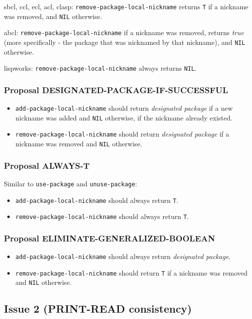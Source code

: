 \documentclass[11pt]{article}
\begin{document}
sbcl, ccl, ecl, acl, clasp:
  \texttt{remove-package-local-nickname} returns \texttt{T} if a nickname was removed,
  and \texttt{NIL} otherwise.

abcl:
  \texttt{remove-package-local-nickname} if a nickname was removed, returns \emph{true} (more
  specifically - the package that was nicknamed by that nickname), and \texttt{NIL}
  otherwise.

lispworks:
  \texttt{remove-package-local-nickname} always returns \texttt{NIL}.
\subsubsection{Proposal DESIGNATED-PACKAGE-IF-SUCCESSFUL}
\label{sec:orgdc44566}
\begin{itemize}
\item \texttt{add-package-local-nickname} should return \emph{designated package} if a new nickname
was added and \texttt{NIL} otherwise, if the nickname already existed.
\item \texttt{remove-package-local-nickname} should return \emph{designated package} if a nickname
was removed and \texttt{NIL} otherwise.
\end{itemize}
\subsubsection{Proposal ALWAYS-T}
\label{sec:org1c835ba}
Similar to \texttt{use-package} and \texttt{unuse-package}:
\begin{itemize}
\item \texttt{add-package-local-nickname} should always return \texttt{T}.
\item \texttt{remove-package-local-nickname} should always return \texttt{T}.
\end{itemize}
\subsubsection{Proposal ELIMINATE-GENERALIZED-BOOLEAN}
\label{sec:org4a66365}
\begin{itemize}
\item \texttt{add-package-local-nickname} should always return \emph{designated package}.
\item \texttt{remove-package-local-nickname} should return \texttt{T} if a nickname was removed and
\texttt{NIL} otherwise.
\end{itemize}

\subsection{Issue 2 (PRINT-READ consistency)}
\label{sec:orgdf64437}
\end{document}
